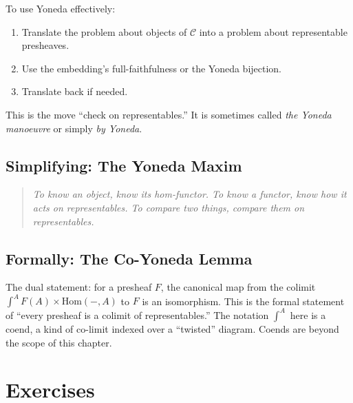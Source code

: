 To use Yoneda effectively:
\begin{enumerate}
  \item Translate the problem about objects of $\mathcal{C}$ into a
        problem about representable presheaves.
  \item Use the embedding's full-faithfulness or the Yoneda bijection.
  \item Translate back if needed.
\end{enumerate}

This is the move ``check on representables.'' It is sometimes called
\emph{the Yoneda manoeuvre} or simply \emph{by Yoneda}.

\subsection{Simplifying: The Yoneda Maxim}

\begin{quote}
\textit{To know an object, know its hom-functor. To know a functor, know
how it acts on representables. To compare two things, compare them on
representables.}
\end{quote}

\subsection{Formally: The Co-Yoneda Lemma}

The dual statement: for a presheaf $F$, the canonical map from the colimit
$\int^A F(A) \times \mathrm{Hom}(-, A)$ to $F$ is an isomorphism. This is
the formal statement of ``every presheaf is a colimit of representables.''
The notation $\int^A$ here is a coend, a kind of co-limit indexed over a
``twisted'' diagram. Coends are beyond the scope of this chapter.


\section*{Exercises}

